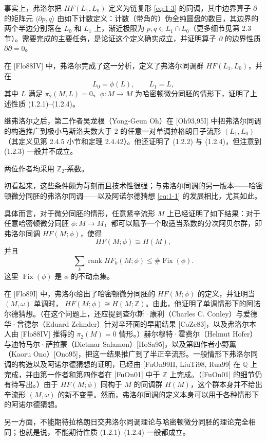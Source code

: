 事实上，弗洛尔把 $HF(L_1,L_0)$ 定义为链复形 \eqref{eq:1-3} 的同调，其中边界算子 $\partial$ 的矩阵元
$\langle\partial p,q\rangle$ 由如下计数定义：计数（带角的）伪全纯圆盘的数目，其边界的两个半边分别落在 $L_0$ 和 $L_1$ 上，渐近极限为
$p,q\in L_1\cap L_0$（更多细节见第 2.3 节）。需要完成的主要任务，是论证这个定义确实成立，并证明算子 $\partial$ 的边界性质 $\partial\partial=0$。

在 [Flo88IV] 中，弗洛尔完成了这一分析，定义了弗洛尔同调群 $HF(L_1,L_0)$，并在
\[
  L_0=\phi(L),\qquad L_1=L,
\]
其中 $L$ 满足 $\pi_2(M,L)=0$、$\phi\colon M\to M$ 为哈密顿微分同胚的情形下，证明了上述性质 (1.2.1)--(1.2.4)。

继弗洛尔之后，第二作者吴龙根（Yong-Geun Oh）在 [Oh93,95I] 中把弗洛尔同调的构造推广到极小马斯洛夫数大于 $2$ 的任意一对单调拉格朗日子流形 $(L_1,L_0)$（其定义见第 2.4.5 小节和定理 2.4.42）。他还证明了 (1.2.2) 与 (1.2.4)，但注意到 (1.2.3) 一般并不成立。

两位作者均采用 $\mathbb Z_2$-系数。

初看起来，这些条件颇为苛刻而且技术性很强；与弗洛尔同调的另一版本——哈密顿微分同胚的弗洛尔同调——以及阿诺尔德猜想 \eqref{eq:1-1} 的发展相比，尤其如此。

具体而言，对于微分同胚的情形，任意紧辛流形 $M$ 上已经证明了如下结果：对于任意哈密顿微分同胚 $\phi\colon M\to M$，都可以赋予一个取适当系数的分次阿贝尔群，即弗洛尔同调 $HF(M;\phi)$，使得
\[
  HF(M;\phi)\cong H(M),
\]
并且
\[
  \sum_k\operatorname{rank}HF_k(M;\phi)\leq \#\operatorname{Fix}(\phi).
\]
这里 $\operatorname{Fix}(\phi)$ 是 $\phi$ 的不动点集。

在 [Flo89I] 中，弗洛尔给出了哈密顿微分同胚的 $HF(M;\phi)$ 的定义，并证明当 $(M,\omega)$ 单调时，
$HF(M;\phi)\cong H(M;\mathbb Z)$。由此，他证明了单调情形下的阿诺尔德猜想。（在这个问题上，还应提到查尔斯·康利（Charles C. Conley）与爱德华·曾德尔（Eduard Zehnder）针对辛环面的早期结果 [CoZe83]，以及弗洛尔本人由 [Flo88IV] 推得的 $\pi_2(M)=0$ 情形。）赫尔穆特·霍费尔（Helmut Hofer）与迪特马尔·萨拉蒙（Dietmar Salamon）[HoSa95]，以及第四作者小野薫（Kaoru Ono）[Ono95]，把这一结果推广到了半正辛流形。一般情形下弗洛尔同调的构造以及阿诺尔德猜想的证明，已经由 [FuOn99II, LiuTi98, Rua99] 在 $\mathbb Q$ 上完成，并由第一作者和第四作者在 [FuOn01] 中于 $\mathbb Z$ 上完成。（[FuOn01] 的细节仍有待写出。）由于 $HF(M;\phi)$ 同构于 $M$ 的同调群 $H(M)$，这个群本身并不给出辛流形 $(M,\omega)$ 的新不变量。然而，弗洛尔同调的定义本身可以用于各种情形下的阿诺尔德猜想。

另一方面，不能期待拉格朗日交弗洛尔同调理论与哈密顿微分同胚的理论完全相同；也就是说，不能期待性质 (1.2.1)--(1.2.4) 一般都成立。

